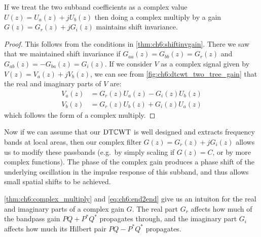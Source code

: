 \begin{theorem}\label{thm:ch6:complex_multiply}
  If we treat the two subband coefficients as a complex value $U(z) = U_a(z) +
  jU_b(z)$ then doing a complex multiply by a gain $G(z) = G_r(z) + jG_i(z)$
  maintains shift invariance.
\end{theorem}
\begin{proof}
  This follows from the conditions in \autoref{thm:ch6:shiftinvgain}. There we
  saw that we maintained shift invariance if 
  $G_{aa}(z) = G_{bb}(z) = G_r(z)$ and $G_{ab}(z) = -G_{ba}(z) = G_i(z)$. 
  If we consider $V$ as a complex signal given by $V(z) = V_a(z) + jV_b(z)$, we
  can see from \autoref{fig:ch6:dtcwt_two_tree_gain} that the real and imaginary
  parts of $V$ are:
  \begin{align}
    V_a(z) &= G_r(z) U_a(z) - G_i(z) U_b(z) \\
    V_b(z) &= G_r(z) U_b(z) + G_i(z) U_a(z) 
  \end{align}
  which follows the form of a complex multiply.
\end{proof}

Now if we can assume that our $\mathrm{DT}\mathbb{C}\mathrm{WT}$ is well designed and extracts frequency
bands at local areas, then our complex filter $G(z)=G_r(z) + jG_i(z)$ allows us
to modify these passbands (e.g.\ by simply scaling if $G(z) = C$, or by more
complex functions). The phase of the complex gain produces a phase shift of the
underlying oscillation in the impulse response of this subband, and thus allows
small spatial shifts to be achieved.

\autoref{thm:ch6:complex_multiply} and \eqref{eq:ch6:end2end} give us an intuiton for the real and
imaginary parts of a complex gain $G$. The real part $G_r$ affects how much of
the bandpass gain $PQ + P^*Q^*$ propagates through, and the imaginary part $G_i$
affects how much its Hilbert pair $PQ-P^*Q^*$ propagates.
